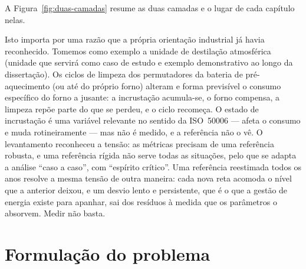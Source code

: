 A Figura~\ref{fig:duas-camadas} resume as duas camadas e o lugar de cada capítulo nelas.



Isto importa por uma razão que a própria orientação industrial
já havia reconhecido. Tomemos como exemplo a unidade de destilação atmosférica (unidade que servirá como caso de estudo e exemplo demonstrativo ao longo da dissertação). Os ciclos de limpeza dos permutadores da bateria de
pré-aquecimento (ou até do próprio forno) alteram e forma previsível o consumo específico do forno
a jusante: a incrustação acumula-se, o forno compensa, a limpeza repõe
parte do que se perdeu, e o ciclo recomeça. O estado de incrustação é uma
variável relevante no sentido da ISO~50006 --- afeta o consumo e muda
rotineiramente --- mas não é medido, e a referência não o vê. O
levantamento reconheceu a tensão: as métricas precisam de uma referência
robusta, e uma referência rígida não serve todas as situações, pelo que
se adapta a análise \enquote{caso a caso}, com \enquote{espírito
crítico}. Uma referência reestimada todos os anos resolve a mesma
tensão de outra maneira: cada nova reta acomoda o nível que a anterior
deixou, e um desvio lento e persistente, que é o que a gestão de energia
existe para apanhar, sai dos resíduos à medida que os parâmetros o
absorvem. Medir não basta.

\section{Formulação do problema}
\label{sec:problema}

